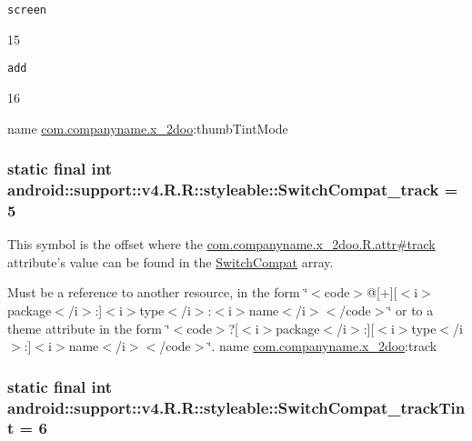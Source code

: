 {\tt screen}

15

{\tt add}

16

name \hyperlink{namespacecom_1_1companyname_1_1x__2doo}{com.companyname.x\_\-2doo}:thumbTintMode \hypertarget{classandroid_1_1support_1_1v4_1_1_r_1_1styleable_e711e9fa38386ec6f701a57cc3ac8c6e}{
\subsubsection[{SwitchCompat\_\-track}]{\setlength{\rightskip}{0pt plus 5cm}static final int android::support::v4.R.R::styleable::SwitchCompat\_\-track = 5}}
\label{classandroid_1_1support_1_1v4_1_1_r_1_1styleable_e711e9fa38386ec6f701a57cc3ac8c6e}


This symbol is the offset where the \hyperlink{classcom_1_1companyname_1_1x__2doo_1_1_r_1_1attr_b09ab26417791942037d9beb93718a25}{com.companyname.x\_\-2doo.R.attr\#track} attribute's value can be found in the \hyperlink{classandroid_1_1support_1_1v4_1_1_r_1_1styleable_276d9c1ec80821a3e0fcdaa41daa75a0}{SwitchCompat} array.

Must be a reference to another resource, in the form \char`\"{}$<$code$>$@\mbox{[}+\mbox{]}\mbox{[}$<$i$>$package$<$/i$>$:\mbox{]}$<$i$>$type$<$/i$>$:$<$i$>$name$<$/i$>$$<$/code$>$\char`\"{} or to a theme attribute in the form \char`\"{}$<$code$>$?\mbox{[}$<$i$>$package$<$/i$>$:\mbox{]}\mbox{[}$<$i$>$type$<$/i$>$:\mbox{]}$<$i$>$name$<$/i$>$$<$/code$>$\char`\"{}.  name \hyperlink{namespacecom_1_1companyname_1_1x__2doo}{com.companyname.x\_\-2doo}:track \hypertarget{classandroid_1_1support_1_1v4_1_1_r_1_1styleable_d119b35aaef8f728924d474d789a2286}{
\subsubsection[{SwitchCompat\_\-trackTint}]{\setlength{\rightskip}{0pt plus 5cm}static final int android::support::v4.R.R::styleable::SwitchCompat\_\-trackTint = 6}}
\label{classandroid_1_1support_1_1v4_1_1_r_1_1styleable_d119b35aaef8f728924d474d789a2286}


